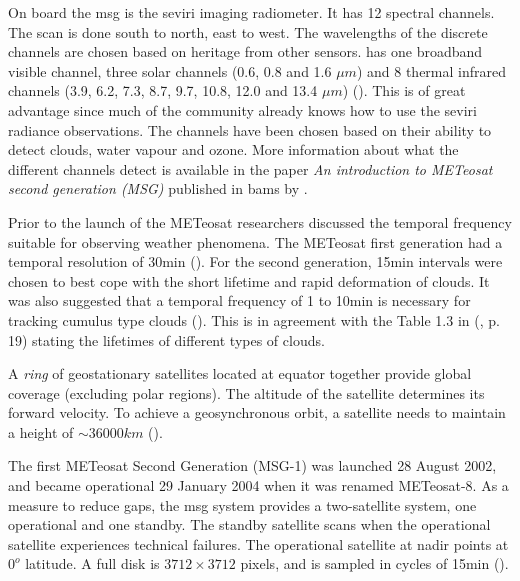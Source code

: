On board the \acrshort{msg} is the \acrfull{seviri} imaging radiometer. It has 12 spectral channels. The scan is done south to north, east to west. The wavelengths of the discrete channels are chosen based on heritage from other sensors.  has one broadband visible channel, three solar channels (0.6, 0.8 and 1.6 $\mu m$) and 8 thermal infrared channels (3.9, 6.2, 7.3, 8.7, 9.7, 10.8, 12.0 and 13.4 $\mu m$) (\cite{Taravat2015MultilayerMasking}). This is of great advantage since much of the community already knows how to use the \acrshort{seviri} radiance observations. The channels have been chosen based on their ability to detect clouds, water vapour and ozone. More information about what the different channels detect is available in the paper \textit{An introduction to METeosat second generation (MSG)} published in \acrshort{bams} by .

Prior to the launch of the METeosat researchers discussed the temporal frequency suitable for observing weather phenomena. The METeosat first generation had a temporal resolution of 30min (\cite{Stockli2019CloudApplications}). For the second generation, 15min intervals were chosen to best cope with the short lifetime and rapid deformation of clouds. It was also suggested that a temporal frequency of 1 to 10min is necessary for tracking cumulus type clouds (\cite{Schmetz_meteosat_intro}). %
This is in agreement with the Table 1.3 in \citeauthor{lohmann2016} (\citeyear{lohmann2016}, p. 19) stating the lifetimes of different types of clouds.

A \textit{ring} of geostationary satellites located at equator together provide global coverage (excluding polar regions). The altitude of the satellite determines its forward velocity. To achieve a geosynchronous orbit, a satellite needs to maintain a height of $\sim 36 000km$ (\cite{Bley2013ASEVIRI}).  

The first METeosat Second Generation (MSG-1) was launched 28 August 2002, and became operational 29 January 2004 when it was renamed METeosat-8. As a measure to reduce gaps, the \acrshort{msg} system provides a two-satellite system, one operational and one standby. The standby satellite scans when the operational satellite experiences technical failures. 
The operational satellite at nadir points at $0^o$ latitude. A full disk is $3712\times 3712$ pixels, and is sampled in cycles of 15min (\cite{Schmetz_meteosat_intro}).

